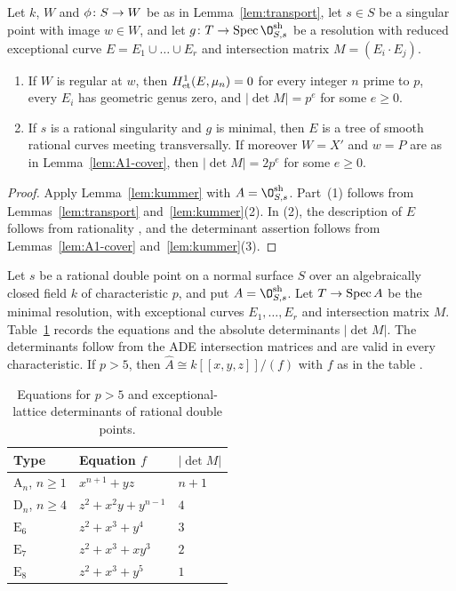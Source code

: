 \begin{corollary}\label{lem:pi1-lattice}
Let $k$, $W$ and $\phi\colon S\to W$ be as in Lemma~\ref{lem:transport}, let $s\in S$ be a singular point with image $w\in W$, and let $g\from T\to\Spec\O^{\rm sh}_{S,s}$ be a resolution with reduced exceptional curve $E = E_1\cup\dots\cup E_r$ and intersection matrix $M = (E_i\cdot E_j)$.
\begin{enumerate}
\item If $W$ is regular at $w$, then $H^1_{\rm et}(E,\mu_n) = 0$ for every integer $n$ prime to $p$, every $E_i$ has geometric genus zero, and $\lvert\det M\rvert = p^e$ for some $e\geq 0$.
\item If $s$ is a rational singularity and $g$ is minimal, then $E$ is a tree of smooth rational curves meeting transversally.
  If moreover $W = X'$ and $w = P$ are as in Lemma~\ref{lem:A1-cover}, then $\lvert\det M\rvert = 2p^e$ for some $e\geq 0$.
\end{enumerate}
\end{corollary}

\begin{proof}
Apply Lemma~\ref{lem:kummer} with $A = \O^{\rm sh}_{S,s}$.
Part~\textup{(1)} follows from Lemmas~\ref{lem:transport} and~\ref{lem:kummer}(2).
In \textup{(2)}, the description of $E$ follows from rationality \cite{Lip69}, and the determinant assertion follows from Lemmas~\ref{lem:A1-cover} and~\ref{lem:kummer}(3).
\end{proof}


Let $s$ be a rational double point on a normal surface $S$ over an algebraically closed field $k$ of characteristic $p$, and put $A = \O^{\rm sh}_{S,s}$.
Let $T\to\operatorname{Spec} A$ be the minimal resolution, with exceptional curves $E_1,\dots,E_r$ and intersection matrix $M$.
Table~\ref{tab:rdp-invariants} records the equations and the absolute determinants $\lvert\det M\rvert$.
The determinants follow from the ADE intersection matrices and are valid in every characteristic.
If $p>5$, then $\widehat A\cong k[[x,y,z]]/(f)$ with $f$ as in the table \cite[Section~3]{Art77}.

\begin{table}[htbp]
\centering
\small
\setlength{\tabcolsep}{4pt}
\renewcommand{\arraystretch}{1.3}
\begin{tabular}{@{}lll@{}}
\hline
Type & Equation $f$ & $\lvert\det M\rvert$ \\
\hline
$\mathrm A_n$, $n\geq 1$ & $x^{n+1}+yz$ & $n+1$ \\
$\mathrm D_n$, $n\geq 4$ & $z^2+x^2y+y^{n-1}$ & $4$ \\
$\mathrm E_6$ & $z^2+x^3+y^4$ & $3$ \\
$\mathrm E_7$ & $z^2+x^3+xy^3$ & $2$ \\
$\mathrm E_8$ & $z^2+x^3+y^5$ & $1$ \\
\hline
\end{tabular}
\caption{Equations for $p>5$ and exceptional-lattice determinants of rational double points.}
\label{tab:rdp-invariants}
\end{table}

